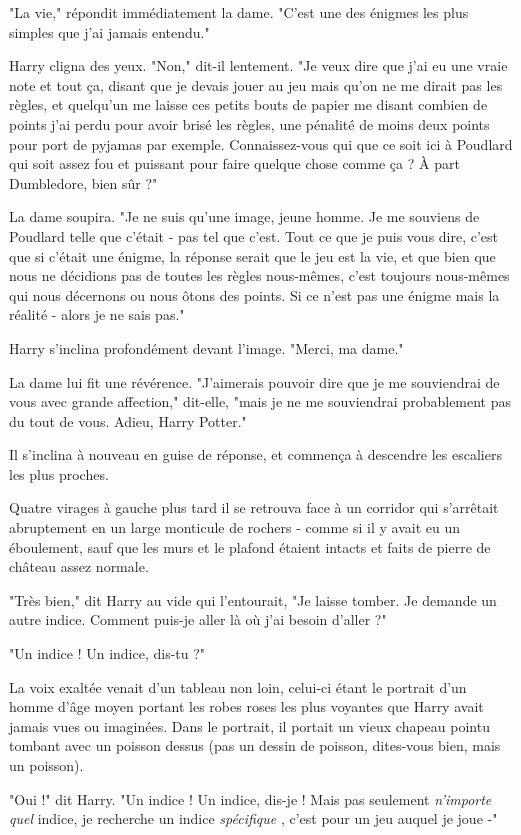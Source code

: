 "La vie," répondit immédiatement la dame. "C'est une des énigmes les plus simples que j'ai jamais entendu."

Harry cligna des yeux. "Non," dit-il lentement. "Je veux dire que j'ai eu une vraie note et tout ça, disant que je devais jouer au jeu mais qu'on ne me dirait pas les règles, et quelqu'un me laisse ces petits bouts de papier me disant combien de points j'ai perdu pour avoir brisé les règles, une pénalité de moins deux points pour port de pyjamas par exemple. Connaissez-vous qui que ce soit ici à Poudlard qui soit assez fou et puissant pour faire quelque chose comme ça ? À part Dumbledore, bien sûr ?"

La dame soupira. "Je ne suis qu'une image, jeune homme. Je me souviens de Poudlard telle que c'était - pas tel que c'est. Tout ce que je puis vous dire, c'est que si c'était une énigme, la réponse serait que le jeu est la vie, et que bien que nous ne décidions pas de toutes les règles nous-mêmes, c'est toujours nous-mêmes qui nous décernons ou nous ôtons des points. Si ce n'est pas une énigme mais la réalité - alors je ne sais pas."

Harry s'inclina profondément devant l'image. "Merci, ma dame."

La dame lui fit une révérence. "J'aimerais pouvoir dire que je me souviendrai de vous avec grande affection," dit-elle, "mais je ne me souviendrai probablement pas du tout de vous. Adieu, Harry Potter."

Il s'inclina à nouveau en guise de réponse, et commença à descendre les escaliers les plus proches.

Quatre virages à gauche plus tard il se retrouva face à un corridor qui s'arrêtait abruptement en un large monticule de rochers - comme si il y avait eu un éboulement, sauf que les murs et le plafond étaient intacts et faits de pierre de château assez normale.

"Très bien," dit Harry au vide qui l'entourait, "Je laisse tomber. Je demande un autre indice. Comment puis-je aller là où j'ai besoin d'aller ?"

"Un indice ! Un indice, dis-tu ?"

La voix exaltée venait d'un tableau non loin, celui-ci étant le portrait d'un homme d'âge moyen portant les robes roses les plus voyantes que Harry avait jamais vues ou imaginées. Dans le portrait, il portait un vieux chapeau pointu tombant avec un poisson dessus (pas un dessin de poisson, dites-vous bien, mais un poisson).

"Oui !" dit Harry. "Un indice ! Un indice, dis-je ! Mais pas seulement \emph{n'importe quel}  indice, je recherche un indice \emph{spécifique} , c'est pour un jeu auquel je joue -"

